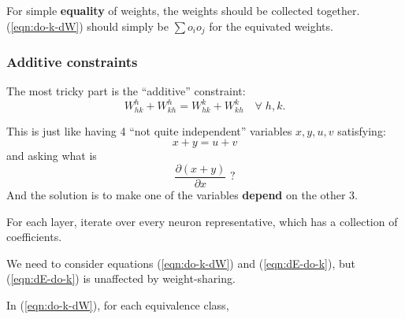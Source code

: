 For simple \textbf{equality} of weights, the weights should be collected together.  (\ref{eqn:do-k-dW}) should simply be $\sum o_i o_j$ for the equivated weights.

\subsubsection{Additive constraints}

The most tricky part is the ``additive'' constraint:
\begin{equation}
W_{hk}^h + W_{kh}^h = W_{hk}^k + W_{kh}^k \quad \forall \; h,k .
\end{equation}

This is just like having 4 ``not quite independent'' variables $x, y, u, v$ satisfying:
\begin{equation}
x + y = u + v
\end{equation}
and asking what is
\begin{equation}
\frac{\partial (x + y)}{\partial x} \mbox{ ?}
\end{equation}
And the solution is to make one of the variables \textbf{depend} on the other 3.

For each layer, iterate over every neuron representative, which has a collection of coefficients.

We need to consider equations (\ref{eqn:do-k-dW}) and (\ref{eqn:dE-do-k}), but (\ref{eqn:dE-do-k}) is unaffected by weight-sharing.

In (\ref{eqn:do-k-dW}), for each equivalence class, 

